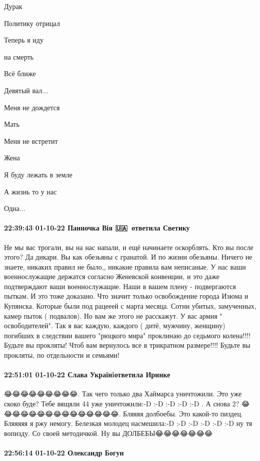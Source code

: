 Дурак

Политику отрицал

Теперь я иду 

на смерть

Всё ближе 

Девятый вал...


Меня не дождется 

Мать

Меня не встретит

Жена

Я буду лежать в земле

А жизнь то у нас

Одна...


\paragraph{22:39:43 01-10-22 Панночка Вія 🇺🇦💙💛ответила Светику}

Не мы вас трогали, вы на нас напали, и ещё начинаете оскорблять. Кто вы после
этого? Да дикари. Вы как обезьяны с гранатой. И по жизни обезьяны. Ничего не
знаете, никаких правил не  было,, никакие правила вам неписаные. У нас  ваши
военнослужащие держатся согласно Женевской конвенции, и это даже подтверждают
ваши военнослужащие. Наши  в вашем плену - подвергаются пыткам. И это тоже
доказано. Что значит только освобождение города Изюма и Купянска. Которые были
под рацееей с марта месяца. Сотни убитых, замученных, камер пыток ( подвалов).
Но вам же этого не расскажут. У вас армия " освободителей". Так я вас каждую,
каждого ( дитё, мужчину, женщину) погибших в следствии вашего "рюцкого мира"
проклинаю до седьмого колена!!!! Будьте вы прокляты! Чтоб вам вернулось все в
трикратном размере!!!! Будьте вы прокляты, по отдельности и семьями!

\paragraph{22:51:01 01-10-22 Слава Українiответила Иринке}

😂😂😂😂😂😂😂😂😂. Так чего только два Хаймарса уничтожили. Это уже скоко
буде? Тебе вящяли 44 уже уничтожили:-D :-D :-D :-D :-D . А снова 2?
😂😂😂😂😂😂😂😂😂😂😂😂😂😂😂. Бляяяя долбоебы. Это какой-то пиздец. Бляяяяя я
ржу немогу. Белезкая молодец насмешила:-D :-D :-D :-D :-D :-D ну тя вопизду. Со
своей методичкой. Ну вы ДОЛБЕБЫ😂😂😂😂😂😂😂

\paragraph{22:56:14 01-10-22 Олександр Богун}


